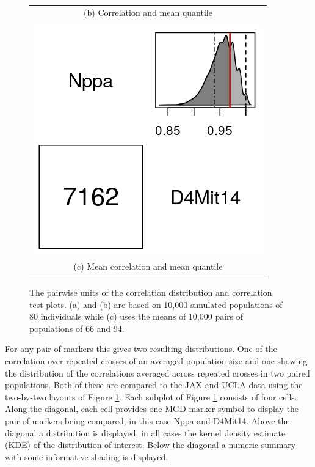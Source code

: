 \documentclass[sts]{imsart}
\begin{document}
\begin{figure}[t]
\begin{center}
\begin{tabular}{c}
      {\footnotesize (b) Correlation and mean quantile} \\
      \\
      \includegraphics[scale = 0.5]{../img/bsbCorrTest2by2a.png} \\
      {\footnotesize (c) Mean correlation and mean quantile} \\
      \\
    \end{tabular}
  \end{center}
  \caption{The pairwise units of the correlation distribution and correlation test plots. (a) and (b) are based on 10,000 simulated populations of 80 individuals while (c) uses the means of 10,000 pairs of populations of 66 and 94.}
  \label{fig:2by2}
\end{figure}

For any pair of markers this gives two resulting distributions. One of the correlation over repeated crosses of an averaged population size and one showing the distribution of the correlations averaged across repeated crosses in two paired populations. Both of these are compared to the JAX and UCLA data using the two-by-two layouts of Figure \ref{fig:2by2}.
Each subplot of Figure \ref{fig:2by2} consists of four cells. Along the diagonal, each cell provides one MGD marker symbol to display the pair of markers being compared, in this case Nppa and D4Mit14. Above the diagonal a distribution is displayed, in all cases the kernel density estimate (KDE) of the distribution of interest. Below the diagonal a numeric summary with some informative shading is displayed.
\end{document}
